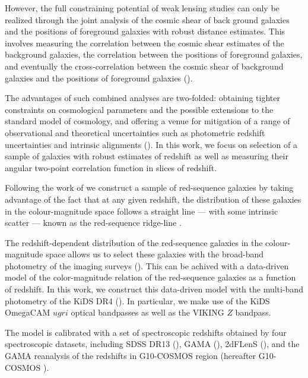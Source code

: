\documentclass[fleqn,usenatbib,useAMS]{mnras}
\begin{document}
However, the full constraining potential of weak lensing studies can only be realized through the joint analysis of the cosmic shear of back ground galaxies and the positions of foreground galaxies with robust distance estimates. This involves measuring the correlation between the cosmic shear estimates of the background galaxies, the correlation between the positions of foreground galaxies, and eventually the cross-correlation between the cosmic shear of background galaxies and the positions of foreground galaxies (\citealt{cacciato2013, cosmolike, des_y1_cosmology, elvin2017, edo2018, prat2017}). 

The advantages of such combined analyses are two-folded: obtaining tighter constraints on cosmological parameters and the possible extensions to the standard model of cosmology, and offering a venue for mitigation of a range of observational and theoretical uncertainties such as photometric redshift uncertainties and intrinsic alignments (\citealt{edo2016, joudaki2018, sam2019}). In this work, we focus on selection of a sample of galaxies with robust estimates of redshift as well as measuring their angular two-point correlation function in slices of redshift. 

Following the work of \citet{vakili2019} we construct a sample of red-sequence galaxies by taking advantage of the fact that at any given redshift, the distribution of these galaxies in the colour-magnitude space follows a straight line --- with some intrinsic scatter --- known as the red-sequence ridge-line \citep[e.g.][]{bower1992,ellis1997,gladders1998,stanford1998}. 

The redshift-dependent distribution of the red-sequence galaxies in the colour-magnitude space allows us to select these galaxies with the broad-band photometry of the imaging surveys (\citealt{gladders_yee2000,hao2009,redmap_sdss,rozo2016,elvin2017,oguri2018,vakili2019}). This can be achived with a data-driven model of the color-magnitude relation of the red-sequence galaxies as a function of redshift. In this work, we construct this data-driven model with the multi-band photometry of the KiDS DR4 (\citealt{kuijken2019}). In particular, we make use of the KiDS OmegaCAM $ugri$ optical bandpasses as well as the VIKING $Z$ bandpass.  

The model is calibrated with a set of spectroscopic redshifts obtained by four spectroscopic datasets, including SDSS DR13 (\citealt{sdss_dr13}), GAMA (\citealt{driver2011}), 2dFLenS (\citealt{blake2016}), and the GAMA reanalysis of the redshifts in G10-COSMOS region (hereafter G10-COSMOS \citealt{davis2015}). 
\end{document}
